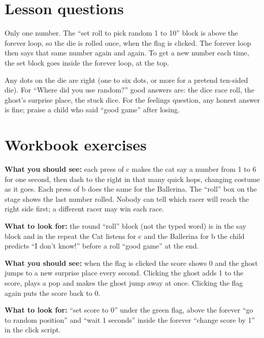 
\section{Lesson questions}
\begin{answer}
Only one number. The \enquote{set roll to pick random 1 to 10} block is above the forever loop, so the die is rolled once, when the flag is clicked. The forever loop then says that same number again and again. To get a new number each time, the set block goes inside the forever loop, at the top.
\end{answer}

\begin{answer}[Reflection]
Any dots on the die are right (one to six dots, or more for a pretend ten-sided die). For \enquote{Where did you use random?} good answers are: the dice race roll, the ghost's surprise place, the stuck dice. For the feelings question, any honest answer is fine; praise a child who said \enquote{good game} after losing.
\end{answer}

\section{Workbook exercises}
\begin{answer}
\textbf{What you should see:} each press of c makes the cat say a number from 1 to 6 for one second, then dash to the right in that many quick hops, changing costume as it goes. Each press of b does the same for the Ballerina. The \enquote{roll} box on the stage shows the last number rolled. Nobody can tell which racer will reach the right side first; a different racer may win each race.

\textbf{What to look for:} \tickbox{} the round \enquote{roll} block (not the typed word) is in the say block and in the repeat \quad \tickbox{} the Cat listens for c and the Ballerina for b \quad \tickbox{} the child predicts \enquote{I don't know!} before a roll \quad \tickbox{} \enquote{good game} at the end.
\end{answer}

\begin{answer}
\textbf{What you should see:} when the flag is clicked the score shows 0 and the ghost jumps to a new surprise place every second. Clicking the ghost adds 1 to the score, plays a pop and makes the ghost jump away at once. Clicking the flag again puts the score back to 0.

\textbf{What to look for:} \tickbox{} \enquote{set score to 0} under the green flag, above the forever \quad \tickbox{} \enquote{go to random position} and \enquote{wait 1 seconds} inside the forever \quad \tickbox{} \enquote{change score by 1} in the click script.
\end{answer}

